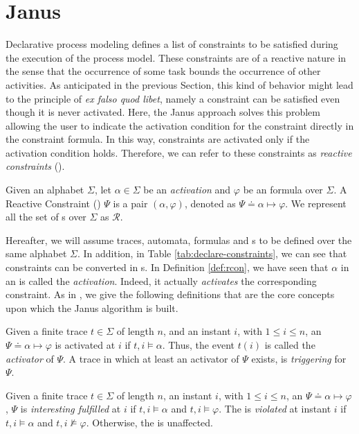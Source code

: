 \section{Janus}\label{sec:janus}
Declarative process modeling defines a list of \declare constraints to be satisfied during the execution of the process model. These constraints are of a reactive nature in the sense that the occurrence of some task bounds the occurrence of other activities. As anticipated in the previous Section, this kind of behavior might lead to the principle of \textit{ex falso quod libet}, namely a constraint can be satisfied even though it is never activated. Here, the Janus approach \citep{cecconi2018interestingness} solves this problem allowing the user to indicate the activation condition for the constraint directly in the constraint formula. In this way, constraints are activated only if the activation condition holds. Therefore, we can refer to these constraints as \textit{reactive constraints} (\rcon).
\begin{definition}\citep{cecconi2018interestingness}\label{def:rcon}
Given an alphabet $\Sigma$, let $\alpha \in \Sigma$ be an \emph{activation} and $\varphi$ be an \LTLp formula over $\Sigma$. A Reactive Constraint (\rcon) $\Psi$ is a pair $(\alpha, \varphi)$, denoted as $\Psi \doteq \alpha  \mapsto \varphi$. We represent all the set of \rcon s over $\Sigma$ as $\mathcal{R}$.
\end{definition}
Hereafter, we will assume traces, automata, \LTLp formulas and \rcon s to be defined over the same alphabet $\Sigma$. In addition, in Table \ref{tab:declare-constraints}, we can see that \declare constraints can be converted in \rcon s. In Definition \ref{def:rcon}, we have seen that $\alpha$ in an \rcon\xspace is called the \emph{activation}. Indeed, it actually \emph{activates} the corresponding constraint. As in \citep{cecconi2018interestingness}, we give the following definitions that are the core concepts upon which the Janus algorithm is built.
\begin{definition}\citep{cecconi2018interestingness}\label{def:activator}
Given a finite trace $t \in \Sigma$ of length $n$, and an instant $i$, with $1 \le i \le n$, an \rcon\xspace $\Psi \doteq \alpha  \mapsto \varphi$ is activated at $i$ if $t,i \models \alpha$. Thus, the event $t(i)$ is called the \emph{activator} of $\Psi$. A trace in which at least an activator of $\Psi$ exists, is \emph{triggering} for $\Psi$.
\end{definition}

\begin{definition}\citep{cecconi2018interestingness}\label{def:interesting-fulfilment}
Given a finite trace $t \in \Sigma$ of length $n$, an instant $i$, with $1 \le i \le n$, an \rcon\xspace $\Psi \doteq \alpha  \mapsto \varphi$, $\Psi$ is \emph{interesting fulfilled} at $i$ if $t,i \models \alpha$ and $t,i \models \varphi$. The \rcon\xspace is \emph{violated} at instant $i$ if $t,i \models \alpha$ and $t,i \not\models \varphi$. Otherwise, the \rcon\xspace is unaffected.
\end{definition}

